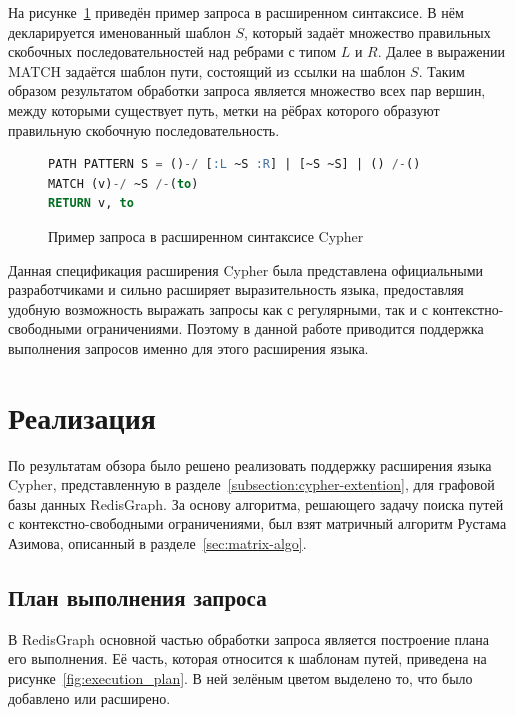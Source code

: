 На рисунке~\ref{code:cypher_query_3} приведён пример запроса в расширенном синтаксисе. В нём декларируется именованный шаблон $S$, который задаёт множество правильных скобочных последовательностей над ребрами с типом $L$ и $R$. Далее в выражении MATCH задаётся шаблон пути, состоящий из ссылки на шаблон $S$. Таким образом результатом обработки запроса является множество всех пар вершин, между которыми существует путь, метки на рёбрах которого образуют правильную скобочную последовательность. 



\begin{figure}[h!]
\begin{lstlisting}[language=sql]
PATH PATTERN S = ()-/ [:L ~S :R] | [~S ~S] | () /-()
MATCH (v)-/ ~S /-(to)
RETURN v, to
\end{lstlisting}
\caption{Пример запроса в расширенном синтаксисе Cypher}
\label{code:cypher_query_3}
\end{figure}

Данная спецификация расширения Cypher была представлена официальными разработчиками и сильно расширяет выразительность языка, предоставляя удобную возможность выражать запросы как с регулярными, так и с контекстно-свободными ограничениями. Поэтому в данной работе приводится поддержка выполнения запросов именно для этого расширения языка.


\section{Реализация}
По результатам обзора было решено реализовать поддержку расширения языка Cypher, представленную в разделе~\ref{subsection:cypher-extention}, для графовой базы данных RedisGraph. За основу алгоритма, решающего задачу поиска путей с контекстно-свободными ограничениями, был взят матричный алгоритм Рустама Азимова, описанный в разделе~\ref{sec:matrix-algo}.


\subsection{План выполнения запроса}\label{execution-plan}
В RedisGraph основной частью обработки запроса является построение плана его выполнения. Её часть, которая относится к шаблонам путей, приведена на рисунке~\ref{fig:execution_plan}. В ней зелёным цветом выделено то, что было добавлено или расширено.

